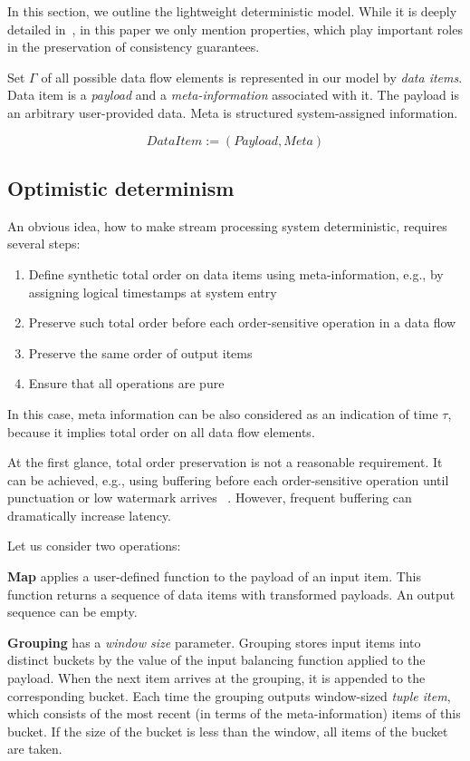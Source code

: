 
\label {fs-model-section}

In this section, we outline the lightweight deterministic model. While it is deeply detailed in~\cite{we2018adbis}, in this paper we only mention properties, which play important roles in the preservation of consistency guarantees.

Set $\Gamma$ of all possible data flow elements is represented in our model by {\em data items}. Data item is a {\it payload} and a {\it meta-information} associated with it. The payload is an arbitrary user-provided data. Meta is structured system-assigned information.

\[DataItem := (Payload, Meta)\]

\subsection{Optimistic determinism}

An obvious idea, how to make stream processing system deterministic, requires several steps:
\begin{enumerate}
    \item Define synthetic total order on data items using meta-information, e.g., by assigning logical timestamps at system entry
    \item Preserve such total order before each order-sensitive operation in a data flow
    \item Preserve the same order of output items
    \item Ensure that all operations are pure
\end{enumerate}

In this case, meta information can be also considered as an indication of time $\tau$, because it implies total order on all data flow elements.

At the first glance, total order preservation is not a reasonable requirement. It can be achieved, e.g., using buffering before each order-sensitive operation until punctuation or low watermark arrives ~\cite{Li:2008:OPN:1453856.1453890}. However, frequent buffering can dramatically increase latency. 

Let us consider two operations:

{\bf Map} applies a user-defined function to the payload of an input item. This function returns a sequence of data items with transformed payloads. An output sequence can be empty.

{\bf Grouping} has a {\it window size} parameter. Grouping stores input items into distinct buckets by the value of the input balancing function applied to the payload. When the next item arrives at the grouping, it is appended to the corresponding bucket. Each time the grouping outputs window-sized {\it tuple item}, which consists of the most recent (in terms of the meta-information) items of this bucket. If the size of the bucket is less than the window, all items of the bucket are taken.

